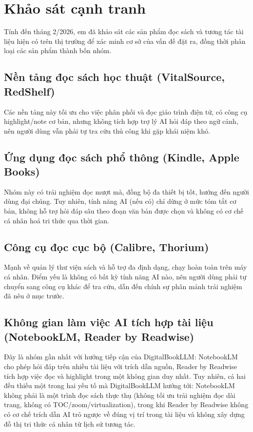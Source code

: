 \section{Khảo sát cạnh tranh}
Tính đến tháng 2/2026, em đã khảo sát các sản phẩm đọc sách và tương tác tài liệu hiện có trên thị trường để xác minh cơ sở của vấn đề đặt ra, đồng thời phân loại các sản phẩm thành bốn nhóm.
\subsection{Nền tảng đọc sách học thuật (VitalSource, RedShelf)}
Các nền tảng này tối ưu cho việc phân phối và đọc giáo trình điện tử, có công cụ highlight/note cơ bản, nhưng không tích hợp trợ lý AI hỏi đáp theo ngữ cảnh, nên người dùng vẫn phải tự tra cứu thủ công khi gặp khái niệm khó.
\subsection{Ứng dụng đọc sách phổ thông (Kindle, Apple Books)}
Nhóm này có trải nghiệm đọc mượt mà, đồng bộ đa thiết bị tốt, hướng đến người dùng đại chúng. Tuy nhiên, tính năng AI (nếu có) chỉ dừng ở mức tóm tắt cơ bản, không hỗ trợ hỏi đáp sâu theo đoạn văn bản được chọn và không có cơ chế cá nhân hoá tri thức qua thời gian.
\subsection{Công cụ đọc cục bộ (Calibre, Thorium)}
Mạnh về quản lý thư viện sách và hỗ trợ đa định dạng, chạy hoàn toàn trên máy cá nhân. Điểm yếu là không có bất kỳ tính năng AI nào, nên người dùng phải tự chuyển sang công cụ khác để tra cứu, dẫn đến chính sự phân mảnh trải nghiệm đã nêu ở mục trước.
\subsection{Không gian làm việc AI tích hợp tài liệu (NotebookLM, Reader by Readwise)}
Đây là nhóm gần nhất với hướng tiếp cận của DigitalBookLLM: NotebookLM cho phép hỏi đáp trên nhiều tài liệu với trích dẫn nguồn, Reader by Readwise tích hợp việc đọc và highlight trong một không gian duy nhất. Tuy nhiên, cả hai đều thiếu một trong hai yếu tố mà DigitalBookLLM hướng tới: NotebookLM không phải là một trình đọc sách thực thụ (không tối ưu trải nghiệm đọc dài trang, không có TOC/zoom/virtualization), trong khi Reader by Readwise không có cơ chế trích dẫn AI trỏ ngược về đúng vị trí trong tài liệu và không xây dựng đồ thị tri thức cá nhân từ lịch sử tương tác.


